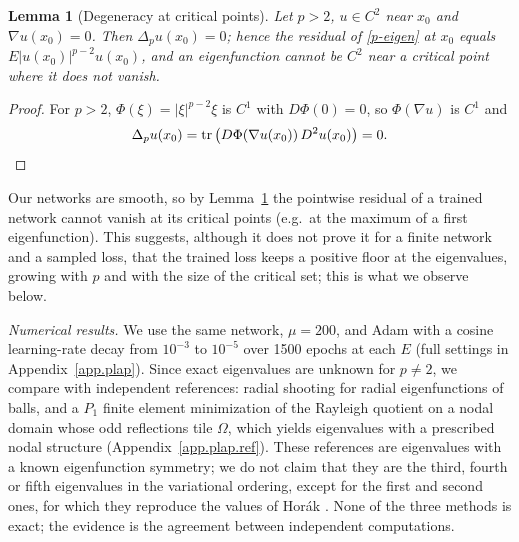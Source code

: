 \documentclass[10pt]{amsart}
\theoremstyle{definition}
\theoremstyle{remark}
\theoremstyle{plain}
\newtheorem{lemma}[theorem]{Lemma}
\begin{document}
\begin{lemma}[Degeneracy at critical points]\label{lem.critical}
Let $p>2$, $u\in C^2$ near $x_0$ and $\nabla u(x_0)=0$. Then $\Delta_pu(x_0)=0$; hence the residual
of \eqref{p-eigen} at $x_0$ equals $E|u(x_0)|^{p-2}u(x_0)$, and an eigenfunction cannot be $C^2$ near
a critical point where it does not vanish.
\end{lemma}
\begin{proof}
For $p>2$, $\Phi(\xi)=|\xi|^{p-2}\xi$ is $C^1$ with $D\Phi(0)=0$, so $\Phi(\nabla u)$ is $C^1$ and
\[
\Delta_pu(x_0)=\operatorname{tr}\big(D\Phi(\nabla u(x_0))\,D^2u(x_0)\big)=0. \qedhere
\]
\end{proof}
Our networks are smooth, so by Lemma~\ref{lem.critical} the pointwise residual of a trained network
cannot vanish at its critical points (e.g.\ at the maximum of a first eigenfunction). This suggests,
although it does not prove it for a finite network and a sampled loss, that the trained loss keeps a
positive floor at the eigenvalues, growing with $p$ and with the size of the critical set; this is
what we observe below.

\emph{Numerical results.} We use the same network, $\mu=200$, and Adam with a cosine learning-rate
decay from $10^{-3}$ to $10^{-5}$ over 1500 epochs at each $E$ (full settings in
Appendix~\ref{app.plap}). Since exact eigenvalues are unknown for $p\ne2$, we compare with independent
references: radial shooting for radial eigenfunctions of balls, and a $P_1$ finite element
minimization of the Rayleigh quotient on a nodal domain whose odd reflections tile $\Omega$, which yields
eigenvalues with a prescribed nodal structure (Appendix~\ref{app.plap.ref}). These references are
eigenvalues with a known eigenfunction symmetry; we do not claim that they are the third, fourth or
fifth eigenvalues in the variational ordering, except for the first and second ones, for which they
reproduce the values of Hor\'ak \cite{HJ11}. None of the three methods is exact; the evidence is the
agreement between independent computations.
\end{document}

